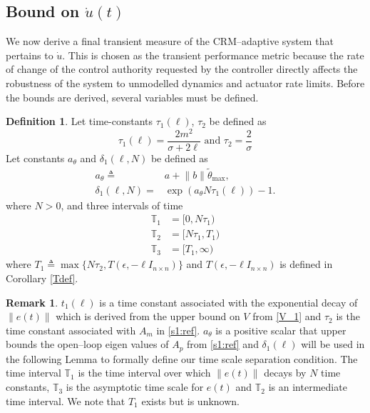 \documentclass[10pt,journal]{IEEEtran}
\theoremstyle{plain}%
\theoremstyle{definition}
\newtheorem{defn}{Definition}%
\newtheorem{rem}{Remark}
\newcommand{\be}[0]{\begin{equation}}
\newcommand{\ee}[0]{\end{equation}}
\newcommand{\norms}[1]{\lVert#1\rVert}
\newcommand{\normB}[0]{\norms}
\let\norm=\normB
\begin{document}


\subsection{Bound on $\dot u (t)$}
We now derive a final transient measure of the CRM--adaptive system that pertains to $\dot u$. This is chosen as the transient performance metric because the rate of change of the control authority requested by the controller directly affects the robustness of the system to unmodelled dynamics and actuator rate limits. Before the bounds are derived, several variables must be defined.

\begin{defn}\label{allt}
Let time-constants $\tau_1(\ell)$, $\tau_2$ be defined as \be\label{taudef1}
\tau_1(\ell)= \frac{2m^2}{ \sigma  +2\ell} \text{ and }
\tau_2=\frac 2 \sigma
\ee
Let constants $a_\theta$ and $\delta_1(\ell,N)$ be defined as
\be\label{es}\begin{split}
a_\theta \triangleq& a+ \norm b \tilde\theta_\text{max},\\
\delta_1(\ell,N)=&\exp{(a_\theta N \tau_1(\ell))}-1.  \end{split}\ee 
where $N>0$, and three intervals of time\be
\begin{split}
\mathbb T_1 &= [0,N\tau_1)\\ 
\mathbb T_2 &= [N\tau_1,T_1) \\
\mathbb T_3 &=[T_1,\infty)
\end{split}
\ee
where $T_1\triangleq\max\{N\tau_2, T(\epsilon,-\ell I_{n\times n})\}$ and $T(\epsilon,-\ell I_{n\times n})$ is defined in Corollary \ref{Tdef}.\end{defn}  
\begin{rem}
$t_1(\ell)$ is a time constant associated with the exponential decay of $\norm{e(t)}$ which is derived from the upper bound on $V$ from \eqref{V_1} and $\tau_2$ is the time constant associated with $A_m$ in \eqref{s1:ref}. $a_\theta$ is a positive scalar that upper bounds the open--loop eigen values of $A_p$ from \eqref{s1:ref} and $\delta_1(\ell)$ will be used in the following Lemma to formally define our time scale separation condition. The time interval $\mathbb T_1$ is the time interval over which $\norm{e(t)}$ decays by $N$  time constants, $\mathbb T_3$ is the asymptotic time scale for $e(t)$ and $\mathbb T_2$ is an intermediate time interval. We note that $T_1$ exists but is unknown. 
\end{rem}
\end{document}
